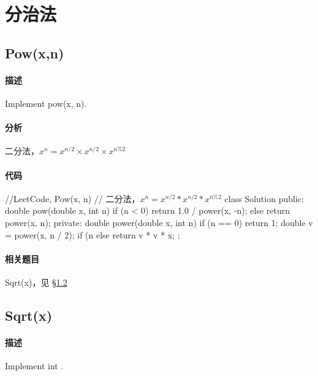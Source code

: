 \chapter{分治法}


\section{Pow(x,n)} %
\label{sec:pow}


\subsubsection{描述}
Implement pow(x, n).


\subsubsection{分析}
二分法，$x^n = x^{n/2} \times x^{n/2} \times x^{n\%2}$


\subsubsection{代码}
\begin{Code}
//LeetCode, Pow(x, n)
// 二分法，$x^n = x^{n/2} * x^{n/2} * x^{n\%2}$
class Solution {
public:
    double pow(double x, int n) {
        if (n < 0) return 1.0 / power(x, -n);
        else return power(x, n);
    }
private:
    double power(double x, int n) {
        if (n == 0) return 1;
        double v = power(x, n / 2);
        if (n %
        else return v * v * x;
    }
};
\end{Code}


\subsubsection{相关题目}

\begindot
\item Sqrt(x)，见 \S \ref{sec:sqrt}
\myenddot


\section{Sqrt(x)} %
\label{sec:sqrt}

\subsubsection{描述}
Implement int .

